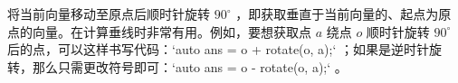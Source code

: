 将当前向量移动至原点后顺时针旋转 $90^{\circ}$ ，即获取垂直于当前向量的、起点为原点的向量。在计算垂线时非常有用。例如，要想获取点 $a$ 绕点 $o$ 顺时针旋转 $90^{\circ}$ 后的点，可以这样书写代码：`auto ans = o + rotate(o, a);` ；如果是逆时针旋转，那么只需更改符号即可：`auto ans = o - rotate(o, a);` 。